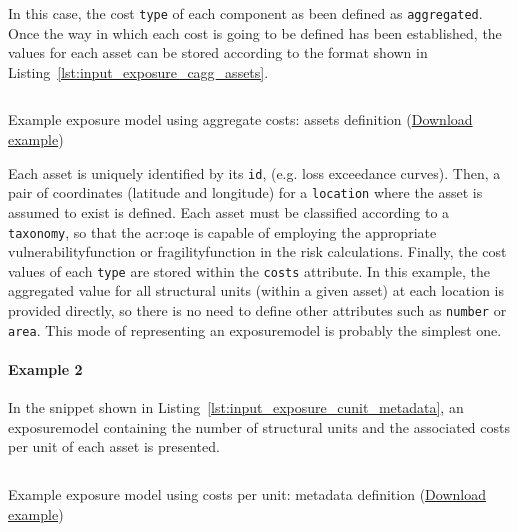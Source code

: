 In this case, the cost \Verb+type+ of each component as been defined as
\Verb+aggregated+. Once the way in which each cost is going to be defined has
been established, the values for each asset can be stored according to the
format shown in Listing~\ref{lst:input_exposure_cagg_assets}.

\begin{listing}[htbp]
  \inputminted[firstline=19,firstnumber=19,lastline=29,fontsize=\footnotesize,frame=single,linenos,bgcolor=lightgray]{xml}{oqum/risk/Verbatim/input_exposure_cagg.xml}
  \caption{Example exposure model using aggregate costs: assets definition (\href{https://raw.githubusercontent.com/GEMScienceTools/oq-engine-docs/master/oqum/risk/verbatim/input_exposure_cagg.xml}{Download example})}
  \label{lst:input_exposure_cagg_assets}
\end{listing}

Each \gls{asset} is uniquely identified by its \Verb+id+, (e.g. loss
exceedance curves). Then, a pair of coordinates (latitude and longitude) for a
\Verb+location+ where the asset is assumed to exist is defined. Each
\gls{asset} must be classified according to a \Verb+taxonomy+, so that the
\glsdesc{acr:oqe} is capable of employing the appropriate
\gls{vulnerabilityfunction} or \gls{fragilityfunction} in the risk
calculations. Finally, the cost values of each \Verb+type+ are stored within
the \Verb+costs+ attribute. In this example, the aggregated value for all
structural units (within a given \gls{asset}) at each location is provided
directly, so there is no need to define other attributes such as \Verb+number+
or \Verb+area+. This mode of representing an \gls{exposuremodel} is probably
the simplest one.


\paragraph{Example 2}

In the snippet shown in Listing~\ref{lst:input_exposure_cunit_metadata}, an
\gls{exposuremodel} containing the number of structural units and the
associated costs per unit of each \gls{asset} is presented.

\begin{listing}[htbp]
  \inputminted[firstline=8,firstnumber=8,lastline=18,fontsize=\footnotesize,frame=single,linenos,bgcolor=lightgray]{xml}{oqum/risk/Verbatim/input_exposure_cunit.xml}
  \caption{Example exposure model using costs per unit: metadata definition (\href{https://raw.githubusercontent.com/GEMScienceTools/oq-engine-docs/master/oqum/risk/verbatim/input_exposure_cunit.xml}{Download example})}
  \label{lst:input_exposure_cunit_metadata}
\end{listing}

